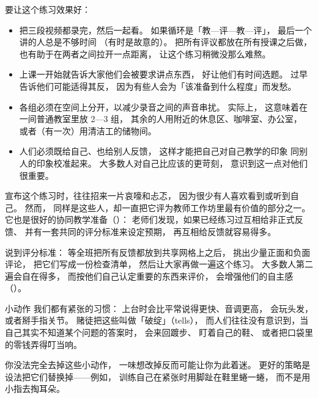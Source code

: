 要让这个练习效果好：

\begin{itemize}

\item
  把三段视频都录完，然后一起看。
  如果循环是「教—评—教—评」，
  最后一个讲的人总是不够时间
  （有时是故意的）。
  把所有评议都放在所有授课之后做，
  也有助于在两者之间拉开一点距离，
  让这个练习稍微没那么难熬。

\item
  上课一开始就告诉大家他们会被要求讲点东西，
  好让他们有时间选题。
  过早告诉他们可能适得其反，
  因为有些人会为「该准备到什么程度」而发愁。

\item
  各组必须在空间上分开，以减少录音之间的声音串扰。
  实际上，
  这意味着在一间普通教室里放 2—3 组，
  其余的人用附近的休息区、咖啡室、办公室，
  或者（有一次）用清洁工的储物间。

\item
  人们必须既给自己、也给别人反馈，
  这样才能把自己对自己教学的印象
  同别人的印象校准起来。
  大多数人对自己比应该的更苛刻，
  意识到这一点对他们很重要。

\end{itemize}

宣布这个练习时，往往招来一片哀嚎和忐忑，
因为很少有人喜欢看到或听到自己。
然而，
同样是这些人，却一直把它评为教师工作坊里最有价值的部分之一。
它也是很好的协同教学准备（）：
老师们发现，如果已经练习过互相给非正式反馈、
并有一套共同的评分标准来设定预期，
再互相给反馈就容易得多。

说到评分标准：
等全班把所有反馈都放到共享网格上之后，
挑出少量正面和负面评论，
把它们写成一份检查清单，
然后让大家再做一遍这个练习。
大多数人第二遍会自在得多，
而按他们自己认定重要的东西来评价，
会增强他们的自主感（）。

\begin{aside}{小动作}
  我们都有紧张的习惯：
  上台时会比平常说得更快、音调更高，
  会玩头发，
  或者掰手指关节。
  赌徒把这些叫做「破绽」（tells），
  而人们往往没有意识到，当自己其实不知道某个问题的答案时，
  会来回踱步、
  盯着自己的鞋、
  或者把口袋里的零钱弄得叮当响。

  你没法完全去掉这些小动作，
  一味想改掉反而可能让你为此着迷。
  更好的策略是设法把它们替换掉——例如，
  训练自己在紧张时用脚趾在鞋里蜷一蜷，
  而不是用小指去掏耳朵。
\end{aside}


